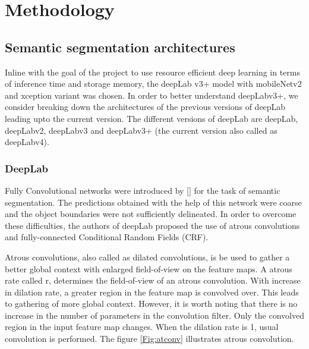 \chapter{Methodology}

\section{Semantic segmentation architectures}
Inline with the goal of the project to use resource efficient deep learning in terms of inference time and storage memory, the deepLab v3+ model with mobileNetv2 and xception variant was chosen. In order to better understand deepLabv3+, we consider breaking down the architectures of the previous versions of deepLab leading upto the current version. The different versions of deepLab are deepLab, deepLabv2, deepLabv3 and deepLabv3+ (the current version also called as deepLabv4).

\subsection{DeepLab}

Fully Convolutional networks were introduced by [] for the task of semantic segmentation. The predictions obtained with the help of this network were coarse and the object boundaries were not sufficiently delineated. In order to overcome these difficulties, the authors of deepLab proposed the use of atrous convolutions and fully-connected Conditional Random Fields (CRF).

Atrous convolutions, also called as dilated convolutions, is be used to gather a better global context with enlarged field-of-view on the feature maps. A atrous rate called r, determines the field-of-view of an atrous convolution. With increase in dilation rate, a greater region in the feature map is convolved over. This leads to gathering of more global context. However, it is worth noting that there is no increase in the number of parameters in the convolution filter. Only the convolved region in the input feature map changes. When the dilation rate is 1, usual convolution is performed. The figure \ref{Fig:atconv} illustrates atrous convolution. 

